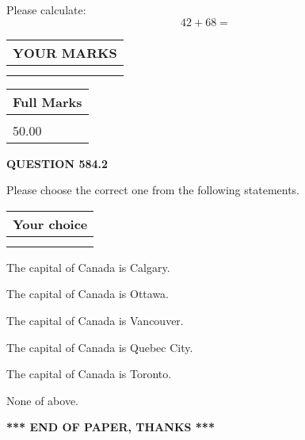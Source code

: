 \documentclass[12pt]{article}
\begin{document}
  
 
Please calculate:
\begin{equation}
42 +  %
68 = \nonumber
\end{equation}
 

 

 
  
\vspace{0.2in}
  
\noindent\begin{tabular}{|l|}
\hline
 YOUR MARKS  \\
\hline
 \\ 
 \\ 
\hline
\end{tabular}
\hspace{0.05in} \begin{tabular}{|l|}
\hline
 Full Marks  \\
\hline
 \\ 
50.00 \\
\hline
\end{tabular}
{\textbf{\Large{QUESTION
584.2 
}}}
  
  
Please choose the correct one from the following statements.
  
  
\noindent\hspace{3.0in} \begin{tabular}{|l|}
\hline
Your choice \\
\hline
 \\ 
 \\ 
\hline
\end{tabular}
  
  
 
 
The capital of Canada is Calgary.
 
 
The capital of Canada is Ottawa.
 
 
The capital of Canada is Vancouver.
 
 
The capital of Canada is Quebec City.
 
 
The capital of Canada is Toronto.
 
 
 None of above.
 
 
   
   
 \vspace{0.2in}
 
   
   
   
   
\vspace{1.0in} 
{\textbf{\large{ *** END OF PAPER, THANKS *** }}} 
   
\end{document}
